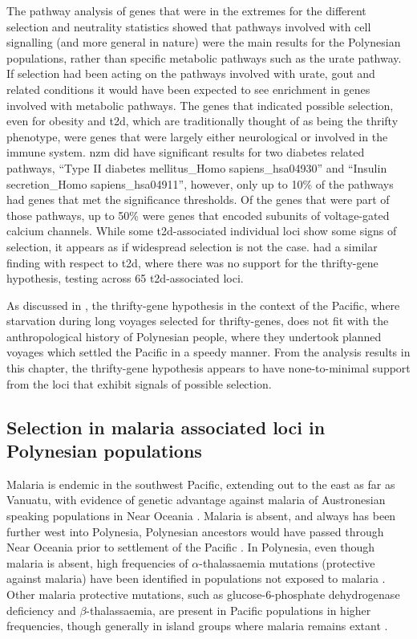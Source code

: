 \documentclass[]{report}
\begin{document}
The pathway analysis of genes that were in the extremes for the
different selection and neutrality statistics showed that pathways
involved with cell signalling (and more general in nature) were the main
results for the Polynesian populations, rather than specific metabolic
pathways such as the urate pathway. If selection had been acting on the
pathways involved with urate, gout and related conditions it would have
been expected to see enrichment in genes involved with metabolic
pathways. The genes that indicated possible selection, even for obesity
and \gls{t2d}, which are traditionally thought of as being the thrifty
phenotype, were genes that were largely either neurological or involved
in the immune system. \gls{nzm} did have significant results for two
diabetes related pathways, ``Type II diabetes mellitus\_Homo
sapiens\_hsa04930'' and ``Insulin secretion\_Homo sapiens\_hsa04911'',
however, only up to 10\% of the pathways had genes that met the
significance thresholds. Of the genes that were part of those pathways,
up to 50\% were genes that encoded subunits of voltage-gated calcium
channels. While some \gls{t2d}-associated individual loci show some
signs of selection, it appears as if widespread selection is not the
case. \citet{Ayub2014c} had a similar finding with respect to \gls{t2d},
where there was no support for the thrifty-gene hypothesis, testing
across 65 \gls{t2d}-associated loci.

As discussed in \citet{Gosling2014}, the thrifty-gene hypothesis in the
context of the Pacific, where starvation during long voyages selected
for thrifty-genes, does not fit with the anthropological history of
Polynesian people, where they undertook planned voyages which settled
the Pacific in a speedy manner. From the analysis results in this
chapter, the thrifty-gene hypothesis appears to have none-to-minimal
support from the loci that exhibit signals of possible selection.

\subsection{Selection in malaria associated loci in Polynesian
populations}\label{selection-in-malaria-associated-loci-in-polynesian-populations}

Malaria is endemic in the southwest Pacific, extending out to the east
as far as Vanuatu, with evidence of genetic advantage against malaria of
Austronesian speaking populations in Near Oceania \citep{Clark1993}.
Malaria is absent, and always has been further west into Polynesia,
Polynesian ancestors would have passed through Near Oceania prior to
settlement of the Pacific \citep{Clark1993}. In Polynesia, even though
malaria is absent, high frequencies of \(\alpha\)-thalassaemia mutations
(protective against malaria) have been identified in populations not
exposed to malaria \citep{Hill1985}. Other malaria protective mutations,
such as glucose-6-phosphate dehydrogenase deficiency and
\(\beta\)-thalassaemia, are present in Pacific populations in higher
frequencies, though generally in island groups where malaria remains
extant \citep{Flint1986, Cappellini2008}.
\end{document}

